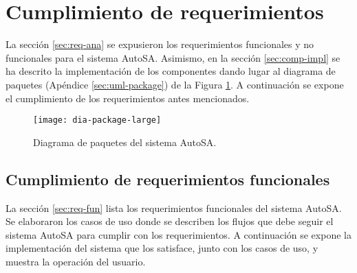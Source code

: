 \section{Cumplimiento de requerimientos}
La sección \ref{sec:req-ana} se expusieron los requerimientos funcionales y no funcionales para el sistema AutoSA. Asimismo, en la sección \ref{sec:comp-impl} se ha descrito la implementación de los componentes dando lugar al diagrama de paquetes (Apéndice \ref{sec:uml-package}) de la Figura \ref{fig:dia-package-large}. A continuación se expone el cumplimiento de los requerimientos antes mencionados.
\begin{figure}[h]
	\centering
	\texttt{[image: dia-package-large]}
	\caption{Diagrama de paquetes del sistema AutoSA.}
	\label{fig:dia-package-large}
\end{figure}
\pagebreak
\subsection{Cumplimiento de requerimientos funcionales}
La sección \ref{sec:req-fun} lista los requerimientos funcionales del sistema AutoSA. Se elaboraron los casos de uso donde se describen los flujos que debe seguir el sistema AutoSA para cumplir con los requerimientos. A continuación se expone la implementación del sistema que los satisface, junto con los casos de uso, y muestra la operación del usuario.
